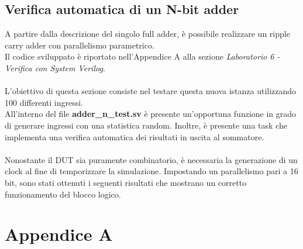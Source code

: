 \documentclass[11pt,  english, makeidx, a4paper, titlepage, oneside]{book}
\newenvironment{listato}{\footnotesize} {\normalsize }
\begin{document}
\section{Verifica automatica di un N-bit adder}
A partire dalla descrizione del singolo full adder, è possibile realizzare un ripple carry adder con parallelismo parametrico.
\\
Il codice sviluppato è riportato nell'Appendice A alla sezione \textit{Laboratorio 6 - Verifica con System Verilog}.
\\\\
L'obiettivo di questa sezione consiste nel testare questa nuova istanza utilizzando 100 differenti ingressi.
\\
All'interno del file \textbf{adder\_n\_test.sv} è presente un'opportuna funzione in grado di generare ingressi con una statistica random. Inoltre, è presente una task che implementa una verifica automatica dei risultati in uscita al sommatore.\\\\
Nonostante il DUT sia puramente combinatorio, è necessaria la generazione di un clock al fine di temporizzare la simulazione. 
Impostando un parallelismo pari a 16 bit, sono stati ottenuti i seguenti risultati che mostrano un corretto funzionamento del blocco logico.
\begin{center}
\begin{listato}
	\centerline{}
\end{listato}
\end{center}
\newpage
\begin{center}
\begin{listato}
	\centerline{}
\end{listato}
\end{center}
\vspace{0.3cm}

\chapter{Appendice A}
\end{document}
